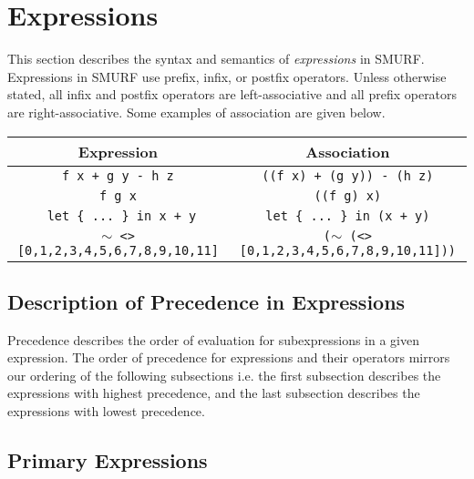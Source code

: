\section{Expressions}

This section describes the syntax and semantics of \emph{expressions} in 
SMURF. Expressions in SMURF use prefix, infix, or postfix operators.
Unless otherwise stated, all infix and postfix operators are left-associative and
all prefix operators are right-associative. Some examples of association are given below.


\begin{center}
	\begin{tabular}{|c|c|}
		\hline
		Expression & Association \\
		\hline
		\texttt{f x + g y - h z} & \texttt{((f x) + (g y)) - (h z)} \\
		\texttt{f g x} & \texttt{((f g) x)} \\
		\texttt{ let \{ ... \} in x + y} & \texttt{let \{ ... \} in (x + y)} \\
		\texttt{$\sim$ <> [0,1,2,3,4,5,6,7,8,9,10,11]} &
					\texttt{($\sim$ (<> [0,1,2,3,4,5,6,7,8,9,10,11]))}\\
		\hline
	\end{tabular}
\end{center}

%
%
%

\subsection{Description of Precedence in Expressions}
Precedence describes the order of evaluation for subexpressions in a given expression.
The order of precedence for expressions and their operators mirrors our ordering of the following
subsections i.e. the first subsection describes the expressions with highest precedence, and the last
subsection describes the expressions with lowest precedence.

\subsection{Primary Expressions}

